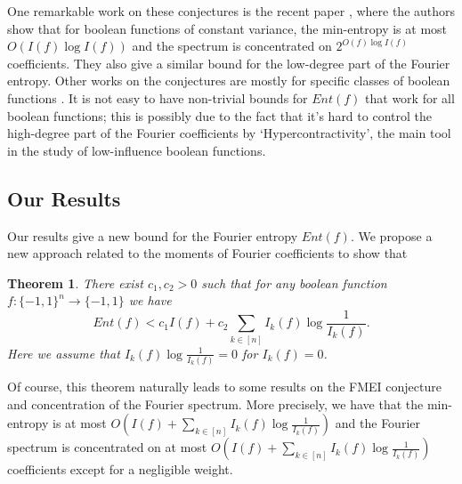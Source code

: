 \documentclass[10pt]{article} \usepackage[utf8]{inputenc}
\newtheorem{thm}{Theorem}
\theoremstyle{definition}
\theoremstyle{remark}
\numberwithin{equation}{section}
\begin{document}
One remarkable work on these conjectures is the recent paper \cite{1}, where the authors show that for boolean functions of constant variance, the min-entropy is at most $O(I(f)\log I(f))$ and the spectrum is concentrated on $2^{O(f)\log I(f)}$ coefficients. They also give a similar bound for the low-degree part of the Fourier entropy. Other works on the conjectures are mostly for specific classes of boolean functions \cite{7,8,12,13,14,17}. It is not easy to have non-trivial bounds for $Ent(f)$ that work for all boolean functions; this is possibly due to the fact that it's hard to control the high-degree part of the Fourier coefficients by `Hypercontractivity', the main tool in the study of low-influence boolean functions.
\subsection{Our Results}
Our results give a new bound for the Fourier entropy $Ent(f)$. We propose a new approach related to the moments of Fourier coefficients to show that
\begin{thm}
\label{T1}
There exist $c_1, c_2>0$ such that for any boolean function $f:\{-1,1\}^n\to \{-1,1\}$ we have
\begin{equation}
Ent(f)< c_1 I(f)+ c_2 \sum_{k\in[n]}I_k(f)\log \frac{1}{I_k(f)}.
\end{equation}
Here we assume that $I_k(f)\log \frac{1}{I_k(f)}=0$ for $I_k(f)=0$.
\end{thm}
Of course, this theorem naturally leads to some results on the FMEI conjecture and concentration of the Fourier spectrum. More precisely, we have that the min-entropy is at most $O(I(f)+\sum\limits_{k\in[n]}I_k(f)\log \frac{1}{I_k(f)})$ and the Fourier spectrum is concentrated on at most $O(I(f)+ \sum\limits_{k\in[n]}I_k(f)\log \frac{1}{I_k(f)})$ coefficients except for a negligible weight. 
\end{document}
